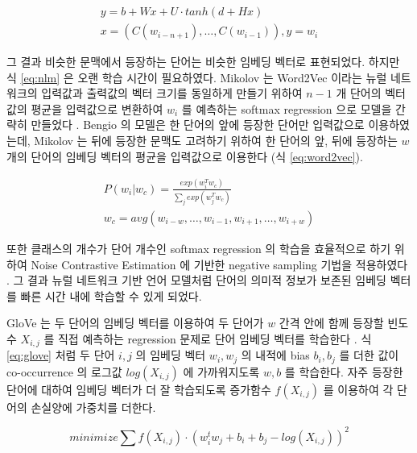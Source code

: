 \documentclass[11pt]{article}
\begin{document}
\begin{equation}
  \label{eq:nlm}
  \begin{aligned}
  y = b + Wx + U \cdot tanh(d + Hx) \\
  x = (C(w_{i-n+1}), \dots, C(w_{i-1})), y = w_i
  \end{aligned}
\end{equation}

그 결과 비슷한 문맥에서 등장하는 단어는 비슷한 임베딩 벡터로 표현되었다.
하지만 식 \ref{eq:nlm} 은 오랜 학습 시간이 필요하였다.
Mikolov 는 Word2Vec 이라는 뉴럴 네트워크의 입력값과 출력값의 벡터 크기를 동일하게 만들기 위하여 $n-1$ 개 단어의 벡터값의 평균을 입력값으로 변환하여 $w_i$ 를 예측하는 softmax regression 으로 모델을 간략히 만들었다 \citep{mikolov2013efficient}.
Bengio 의 모델은 한 단어의 앞에 등장한 단어만 입력값으로 이용하였는데, Mikolov 는 뒤에 등장한 문맥도 고려하기 위하여 한 단어의 앞, 뒤에 등장하는 $w$ 개의 단어의 임베딩 벡터의 평균을 입력값으로 이용한다 (식 \ref{eq:word2vec}).

\begin{equation}
  \label{eq:word2vec}
  \begin{aligned}
  P(w_i \vert w_c) = \frac{exp(w_i^T w_c)}{\sum_j exp(w_j^T w_c)} \\
  w_c = avg(w_{i-w}, \dots, w_{i-1}, w_{i+1}, \dots, w_{i+w})
  \end{aligned}
\end{equation}

또한 클래스의 개수가 단어 개수인 softmax regression 의 학습을 효율적으로 하기 위하여 Noise Contrastive Estimation \citep{gutmann2010noise} 에 기반한 negative sampling 기법을 적용하였다 \citep{mikolov2013distributed}.
그 결과 뉴럴 네트워크 기반 언어 모델처럼 단어의 의미적 정보가 보존된 임베딩 벡터를 빠른 시간 내에 학습할 수 있게 되었다.

GloVe 는 두 단어의 임베딩 벡터를 이용하여 두 단어가 $w$ 간격 안에 함께 등장할 빈도수 $X_{i,j}$ 를 직접 예측하는 regression 문제로 단어 임베딩 벡터를 학습한다 \citep{pennington2014glove}.
식 \ref{eq:glove} 처럼 두 단어 $i, j$ 의 임베딩 벡터 $w_i, w_j$ 의 내적에 bias $b_i, b_j$ 를 더한 값이 co-occurrence 의 로그값 $log(X_{i,j})$ 에 가까워지도록 $w, b$ 를 학습한다.
자주 등장한 단어에 대하여 임베딩 벡터가 더 잘 학습되도록 증가함수 $f(X_{i,j})$ 를 이용하여 각 단어의 손실양에 가중치를 더한다.

\begin{equation}
  \label{eq:glove}
  minimize \sum f(X_{i,j}) \cdot \left( w_i^t w_j + b_i + b_j - log(X_{i,j}) \right)^2
\end{equation}
\end{document}
